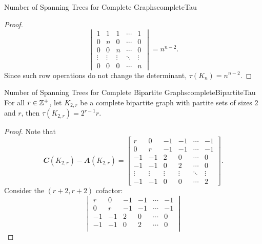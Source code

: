 \documentclass[math]{amznotes}
\theoremstyle{remark}
\newcommand{\0}{\mathbf{0}}
\newcommand{\1}{\mathbf{1}}
\begin{document}
\begin{probox}{Number of Spanning Trees for Complete Graphs}{completeTau}
\begin{proof}
        \begin{equation*}
            \begin{vmatrix}
                1 & 1 & 1 & \cdots & 1 \\
                0 & n & 0 & \cdots & 0 \\
                0 & 0 & n & \cdots & 0 \\
                \vdots & \vdots & \vdots & \ddots & \vdots \\
                0 & 0 & 0 & \cdots & n
            \end{vmatrix} = n^{n - 2}.
        \end{equation*}
        Since such row operations do not change the determinant, $\tau(K_n) = n^{n - 2}$.
    \end{proof}
\end{probox}
\begin{probox}{Number of Spanning Trees for Complete Bipartite Graphs}{completeBipartiteTau}
    For all $r \in \mathbb{Z}^+$, let $K_{2, r}$ be a complete bipartite graph with partite sets of sizes $2$ and $r$, then $\tau\left(K_{2, r}\right) = 2^{r - 1}r$.
    \tcblower
    \begin{proof}
        Note that
        \begin{equation*}
            \mathbfit{C}(K_{2, r}) - \mathbfit{A}(K_{2, r}) = \begin{bmatrix}
                r & 0 & -1 & -1 & \cdots & -1 \\
                0 & r & -1 & -1 & \cdots & -1 \\
                -1 & -1 & 2 & 0 & \cdots & 0 \\
                -1 & -1 & 0 & 2 & \cdots & 0 \\
                \vdots & \vdots & \vdots & \vdots & \ddots & \vdots \\
                -1 & -1 & 0 & 0 & \cdots & 2
            \end{bmatrix}.
        \end{equation*}
        Consider the $(r + 2, r + 2)$ cofactor:
        \begin{equation*}
            \begin{vmatrix}
                r & 0 & -1 & -1 & \cdots & -1 \\
                0 & r & -1 & -1 & \cdots & -1 \\
                -1 & -1 & 2 & 0 & \cdots & 0 \\
                -1 & -1 & 0 & 2 & \cdots & 0 \\

\end{vmatrix}
\end{equation*}
\end{proof}
\end{probox}
\end{document}
